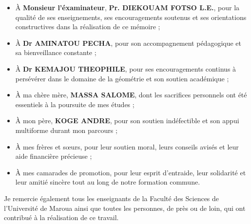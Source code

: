 \documentclass[a4paper, 14pt]{report}
\newcommand{\applyfontsize}{%
	\fontsize{12}{12}\selectfont
}
\begin{document}
\begin{onehalfspace}
{\begin{itemize}
	\item À \textbf{Monsieur l'éxaminateur}, \textbf{Pr. DIEKOUAM FOTSO L.E.}, pour la qualité de ses enseignements, ses encouragements soutenus et ses orientations constructives dans la réalisation de ce mémoire ;

	
	\item À \textbf{Dr AMINATOU PECHA}, pour son accompagnement pédagogique et sa bienveillance constante ;
	
	\item À \textbf{Dr KEMAJOU THEOPHILE}, pour ses encouragements continus à persévérer dans le domaine de la géométrie et son soutien académique ;
	
	\item À ma chère mère, \textbf{MASSA SALOME}, dont les sacrifices personnels ont été essentiels à la poursuite de mes études ;
	
	\item À mon père, \textbf{KOGE ANDRE}, pour son soutien indéfectible et son appui multiforme durant mon parcours ;
	
	\item À mes frères et sœurs, pour leur soutien moral, leurs conseils avisés et leur aide financière précieuse ;
	
	\item À mes camarades de promotion, pour leur esprit d’entraide, leur solidarité et leur amitié sincère tout au long de notre formation commune.
\end{itemize}


Je remercie également tous les enseignants de la Faculté des Sciences de l’Université de Maroua ainsi que toutes les personnes, de près ou de loin, qui ont contribué à la réalisation de ce travail.


}

{
	\applyfontsize %
	
\tableofcontents
}



\end{onehalfspace}
\end{document}
